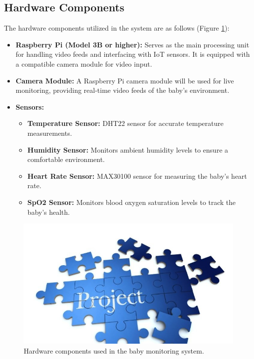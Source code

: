 \documentclass[12pt,a4paper]{report}
\begin{document}
\subsection{Hardware Components}
The hardware components utilized in the system are as follows (Figure \ref{fig:hardware}):

\begin{itemize}
  \item \textbf{Raspberry Pi (Model 3B or higher):} Serves as the main processing unit for handling video feeds and interfacing with IoT sensors. It is equipped with a compatible camera module for video input.

  \item \textbf{Camera Module:} A Raspberry Pi camera module will be used for live monitoring, providing real-time video feeds of the baby’s environment.

  \item \textbf{Sensors:}
        \begin{itemize}
          \item \textbf{Temperature Sensor:} DHT22 sensor for accurate temperature measurements.
          \item \textbf{Humidity Sensor:} Monitors ambient humidity levels to ensure a comfortable environment.
          \item \textbf{Heart Rate Sensor:} MAX30100 sensor for measuring the baby's heart rate.
          \item \textbf{SpO2 Sensor:} Monitors blood oxygen saturation levels to track the baby's health.
        \end{itemize}
\end{itemize}

\begin{figure}[H]
  \centering
  \includegraphics[scale=0.3]{./pic/sample.jpg}
  \caption{Hardware components used in the baby monitoring system.}
  \label{fig:hardware}
\end{figure}
\end{document}
